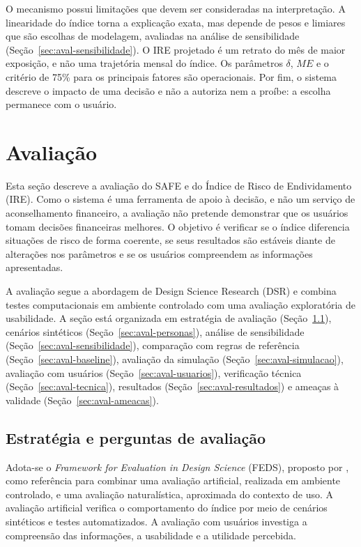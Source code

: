 \documentclass[portuguese]{sbc2025}%
\begin{document}
O mecanismo possui limitações que devem ser consideradas na interpretação. A linearidade do índice torna a explicação exata, mas depende de pesos e limiares que são escolhas de modelagem, avaliadas na análise de sensibilidade (Seção~\ref{sec:aval-sensibilidade}). O IRE projetado é um retrato do mês de maior exposição, e não uma trajetória mensal do índice. Os parâmetros $\delta$, $ME$ e o critério de 75\% para os principais fatores são operacionais. Por fim, o sistema descreve o impacto de uma decisão e não a autoriza nem a proíbe: a escolha permanece com o usuário.

\section{Avaliação}
\label{sec:avaliacao}

Esta seção descreve a avaliação do SAFE e do Índice de Risco de
Endividamento (IRE). Como o sistema é uma ferramenta de apoio à decisão,
e não um serviço de aconselhamento financeiro, a avaliação não pretende
demonstrar que os usuários tomam decisões financeiras melhores. O
objetivo é verificar se o índice diferencia situações de risco de forma
coerente, se seus resultados são estáveis diante de alterações nos
parâmetros e se os usuários compreendem as informações apresentadas.

A avaliação segue a abordagem de Design Science Research (DSR)
\citep{hevner2004,venable2016} e combina testes computacionais em
ambiente controlado com uma avaliação exploratória de usabilidade.
A seção está organizada em estratégia de avaliação
(Seção~\ref{sec:aval-estrategia}), cenários sintéticos
(Seção~\ref{sec:aval-personas}), análise de sensibilidade
(Seção~\ref{sec:aval-sensibilidade}), comparação com regras de referência
(Seção~\ref{sec:aval-baseline}), avaliação da simulação
(Seção~\ref{sec:aval-simulacao}), avaliação com usuários
(Seção~\ref{sec:aval-usuarios}), verificação técnica
(Seção~\ref{sec:aval-tecnica}), resultados
(Seção~\ref{sec:aval-resultados}) e ameaças à validade
(Seção~\ref{sec:aval-ameacas}).

\subsection{Estratégia e perguntas de avaliação}
\label{sec:aval-estrategia}

Adota-se o \textit{Framework for Evaluation in Design Science}
(FEDS), proposto por \citet{venable2016}, como referência para combinar
uma avaliação artificial, realizada em ambiente controlado, e uma
avaliação naturalística, aproximada do contexto de uso. A avaliação
artificial verifica o comportamento do índice por meio de cenários
sintéticos e testes automatizados. A avaliação com usuários investiga
a compreensão das informações, a usabilidade e a utilidade percebida.
\end{document}
